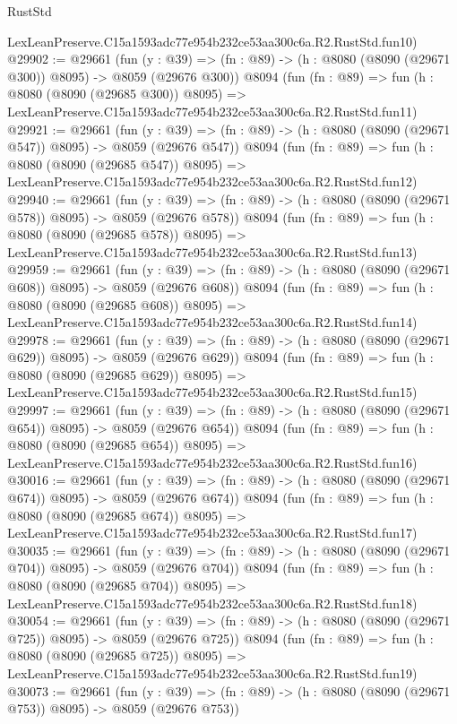 \begin{lexlean}{RustStd}
\begin{coremodule}
    LexLeanPreserve.C15a1593adc77e954b232ce53aa300c6a.R2.RustStd.fun10)
@29902 := @29661
    (fun (y : @39) => (fn : @89) -> (h : @8080 (@8090 (@29671 @300)) @8095) -> @8059 (@29676 @300))
    @8094
    (fun (fn : @89) =>
    fun (h : @8080 (@8090 (@29685 @300)) @8095) =>
    LexLeanPreserve.C15a1593adc77e954b232ce53aa300c6a.R2.RustStd.fun11)
@29921 := @29661
    (fun (y : @39) => (fn : @89) -> (h : @8080 (@8090 (@29671 @547)) @8095) -> @8059 (@29676 @547))
    @8094
    (fun (fn : @89) =>
    fun (h : @8080 (@8090 (@29685 @547)) @8095) =>
    LexLeanPreserve.C15a1593adc77e954b232ce53aa300c6a.R2.RustStd.fun12)
@29940 := @29661
    (fun (y : @39) => (fn : @89) -> (h : @8080 (@8090 (@29671 @578)) @8095) -> @8059 (@29676 @578))
    @8094
    (fun (fn : @89) =>
    fun (h : @8080 (@8090 (@29685 @578)) @8095) =>
    LexLeanPreserve.C15a1593adc77e954b232ce53aa300c6a.R2.RustStd.fun13)
@29959 := @29661
    (fun (y : @39) => (fn : @89) -> (h : @8080 (@8090 (@29671 @608)) @8095) -> @8059 (@29676 @608))
    @8094
    (fun (fn : @89) =>
    fun (h : @8080 (@8090 (@29685 @608)) @8095) =>
    LexLeanPreserve.C15a1593adc77e954b232ce53aa300c6a.R2.RustStd.fun14)
@29978 := @29661
    (fun (y : @39) => (fn : @89) -> (h : @8080 (@8090 (@29671 @629)) @8095) -> @8059 (@29676 @629))
    @8094
    (fun (fn : @89) =>
    fun (h : @8080 (@8090 (@29685 @629)) @8095) =>
    LexLeanPreserve.C15a1593adc77e954b232ce53aa300c6a.R2.RustStd.fun15)
@29997 := @29661
    (fun (y : @39) => (fn : @89) -> (h : @8080 (@8090 (@29671 @654)) @8095) -> @8059 (@29676 @654))
    @8094
    (fun (fn : @89) =>
    fun (h : @8080 (@8090 (@29685 @654)) @8095) =>
    LexLeanPreserve.C15a1593adc77e954b232ce53aa300c6a.R2.RustStd.fun16)
@30016 := @29661
    (fun (y : @39) => (fn : @89) -> (h : @8080 (@8090 (@29671 @674)) @8095) -> @8059 (@29676 @674))
    @8094
    (fun (fn : @89) =>
    fun (h : @8080 (@8090 (@29685 @674)) @8095) =>
    LexLeanPreserve.C15a1593adc77e954b232ce53aa300c6a.R2.RustStd.fun17)
@30035 := @29661
    (fun (y : @39) => (fn : @89) -> (h : @8080 (@8090 (@29671 @704)) @8095) -> @8059 (@29676 @704))
    @8094
    (fun (fn : @89) =>
    fun (h : @8080 (@8090 (@29685 @704)) @8095) =>
    LexLeanPreserve.C15a1593adc77e954b232ce53aa300c6a.R2.RustStd.fun18)
@30054 := @29661
    (fun (y : @39) => (fn : @89) -> (h : @8080 (@8090 (@29671 @725)) @8095) -> @8059 (@29676 @725))
    @8094
    (fun (fn : @89) =>
    fun (h : @8080 (@8090 (@29685 @725)) @8095) =>
    LexLeanPreserve.C15a1593adc77e954b232ce53aa300c6a.R2.RustStd.fun19)
@30073 := @29661
    (fun (y : @39) => (fn : @89) -> (h : @8080 (@8090 (@29671 @753)) @8095) -> @8059 (@29676 @753))

\end{coremodule}
\end{lexlean}
